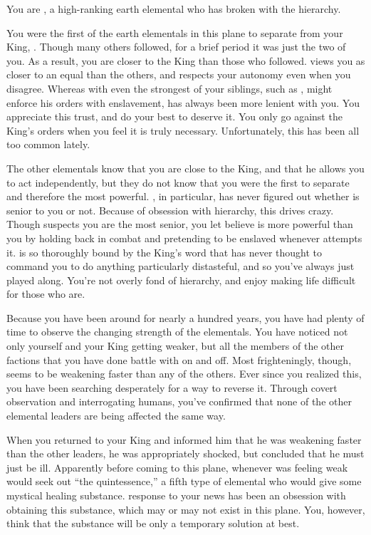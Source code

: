 \documentclass[char]{elementals}
\begin{document}
\name{\cRogue{}}

You are \cRogue{\intro}, a high-ranking earth elemental who has broken with the hierarchy.

You were the first of the earth elementals in this plane to separate from your King, \cEarthKing{}.  Though many others followed, for a brief period it was just the two of you.  As a result, you are closer to the King than those who followed.  \cEarthKing{\They} views you as closer to an equal than the others, and respects your autonomy even when you disagree.  Whereas with even the strongest of your siblings, such as \cLoyal{\intro}, \cEarthKing{} might enforce his orders with enslavement, \cEarthKing{\they} has always been more lenient with you.  You appreciate this trust, and do your best to deserve it.  You only go against the King's orders when you feel it is truly necessary.  Unfortunately, this has been all too common lately.

The other elementals know that you are close to the King, and that he allows you to act independently, but they do not know that you were the first to separate and therefore the most powerful.  \cLoyal{}, in particular, has never figured out whether \cLoyal{\they} is senior to you or not.  Because of \cLoyal{\their} obsession with hierarchy, this drives \cLoyal{\them} crazy.  Though \cLoyal{\they} suspects you are the most senior, you let \cLoyal{\them} believe \cLoyal{\they} is more powerful than you by holding back in combat and pretending to be enslaved whenever \cLoyal{\they} attempts it.  \cLoyal{} is so thoroughly bound by the King's word that \cLoyal{\they} has never thought to command you to do anything particularly distasteful, and so you've always just played along.  You're not overly fond of hierarchy, and enjoy making life difficult for those who are.

Because you have been around for nearly a hundred years, you have had plenty of time to observe the changing strength of the elementals.  You have noticed not only yourself and your King getting weaker, but all the members of the other factions that you have done battle with on and off.  Most frighteningly, though, \cEarthKing{} seems to be weakening faster than any of the others.  Ever since you realized this, you have been searching desperately for a way to reverse it.  Through covert observation and interrogating humans, you've confirmed that none of the other elemental leaders are being affected the same way.

When you returned to your King and informed him that he was weakening faster than the other leaders, he was appropriately shocked, but concluded that he must just be ill.  Apparently before coming to this plane, whenever \cEarthKing{\they} was feeling weak \cEarthKing{\they} would seek out ``the quintessence,'' a fifth type of elemental who would give \cEarthKing{\them} some mystical healing substance.  \cEarthKing{\Their} response to your news has been an obsession with obtaining this substance, which may or may not exist in this plane.  You, however, think that the substance will be only a temporary solution at best.
\end{document}
